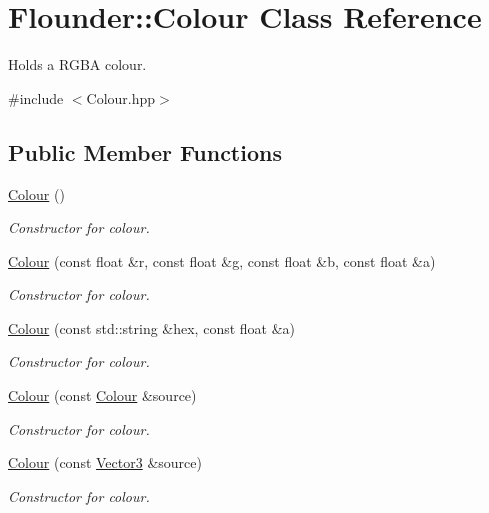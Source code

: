 \hypertarget{class_flounder_1_1_colour}{}\section{Flounder\+:\+:Colour Class Reference}
\label{class_flounder_1_1_colour}


Holds a R\+G\+BA colour.  




{\ttfamily \#include $<$Colour.\+hpp$>$}

\subsection*{Public Member Functions}
\begin{DoxyCompactItemize}
\item 
\hyperlink{class_flounder_1_1_colour_a2cfe1397d03186a379eaa91c32713bc0}{Colour} ()
\begin{DoxyCompactList}\small\item\em Constructor for colour. \end{DoxyCompactList}\item 
\hyperlink{class_flounder_1_1_colour_a8334d8cc6c7b68b4520848ce1a6e5fd2}{Colour} (const float \&r, const float \&g, const float \&b, const float \&a)
\begin{DoxyCompactList}\small\item\em Constructor for colour. \end{DoxyCompactList}\item 
\hyperlink{class_flounder_1_1_colour_a81a69b320666743b9d959f2c7e6881cf}{Colour} (const std\+::string \&hex, const float \&a)
\begin{DoxyCompactList}\small\item\em Constructor for colour. \end{DoxyCompactList}\item 
\hyperlink{class_flounder_1_1_colour_a8f0b80aadc1a8c5b916e361e98969821}{Colour} (const \hyperlink{class_flounder_1_1_colour}{Colour} \&source)
\begin{DoxyCompactList}\small\item\em Constructor for colour. \end{DoxyCompactList}\item 
\hyperlink{class_flounder_1_1_colour_a1127b00a5afed1b311117a8f5d13224d}{Colour} (const \hyperlink{class_flounder_1_1_vector3}{Vector3} \&source)
\begin{DoxyCompactList}\small\item\em Constructor for colour. \end{DoxyCompactList}\item 

\end{DoxyCompactItemize}
